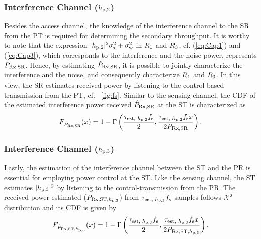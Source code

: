 \subsubsection*{Interference Channel ($h_{\text{p,2}}$)}
Besides the access channel, the knowledge of the interference channel to the SR from the PT is required for determining the secondary throughput. It is worthy to note that the expression $|h_{\text{p,2}}|^2 \sigma^2_{\text{s}} + \sigma^2_{\text{w}}$ in $R_{\text{1}}$ and $R_{\text{3}}$, cf. (\ref{eq:Cap1}) and (\ref{eq:Cap3}), which corresponds to the interference and the noise power, represents $P_{\text{Rx,SR}}$. Hence, by estimating $\hat{P}_{\text{Rx,SR}}$, it is possible to jointly characterize the interference and the noise, and consequently characterize $R_{\text{1}}$ and $R_{\text{3}}$.  
In this view, the SR estimates received power by listening to the control-based transmission from the PT, cf. \figurename~\ref{fig:fs}. Similar to the sensing channel, the CDF of the estimated interference power received $\hat{P}_{\text{Rx,SR}}$ at the ST is characterized as
\begin{align}
F_{\hat{P}_{\text{Rx,SR}}}(x) = 1 - \Gamma \left( \frac{\tau_{\text{est, $h_{\text{p,2}}$}} f_{\text{s}}}{2}, \frac{\tau_{\text{est, $h_{\text{p,2}}$}} f_{\text{s}} x}{2 P_{\text{Rx,SR}}} \right) \label{eq:fprcvdsr}.
\end{align}

  

\subsubsection*{Interference Channel ($h_{\text{p,3}}$)}
Lastly, the estimation of the interference channel between the ST and the PR is essential for employing power control at the ST. Like the sensing channel, the ST estimates $|h_{\text{p,3}}|^2$ by listening to the control-transmission from the PR. The received power estimated ($P_{\text{Rx,ST,$h_{\text{p,3}}$}}$) from $\tau_{\text{est, $h_{\text{p,3}}$}} f_{\text{s}}$ samples follows $\cchi2$ distribution and its CDF is given by  
\begin{align}
F_{\hat{P}_{\text{Rx,ST,$h_{\text{p,3}}$}}}(x) = 1 - \Gamma \left( \frac{\tau_{\text{est, $h_{\text{p,3}}$}} f_{\text{s}}}{2}, \frac{\tau_{\text{est, $h_{\text{p,3}}$}} f_{\text{s}} x}{2 P_{\text{Rx,ST,$h_{\text{p,3}}$}}} \right) \label{eq:fprcvdstpr}.
\end{align}

